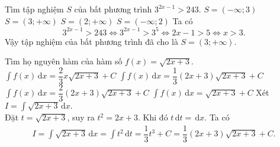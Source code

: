 \begin{ex}%
	Tìm tập nghiệm $S$ của bất phương trình $3^{2x-1}>243$.
	\choice
	{$S=(-\infty;3)$}
	{\True $S=(3;+\infty )$}
	{$S=(2;+\infty )$}
	{$S=(-\infty;2)$}
	\loigiai
	{
		Ta có
		\begin{equation*}
		3^{2x-1}>243 \Leftrightarrow 3^{2x-1} > 3^5 \Leftrightarrow 2x-1 > 5 \Leftrightarrow x > 3.
		\end{equation*}
		Vậy tập nghiệm của bất phương trình đã cho là $S = (3;+\infty)$.
	}
\end{ex}
\begin{ex}%
	Tìm họ nguyên hàm của hàm số $f(x)=\sqrt{2x+3}$.
	\choice
	{$\displaystyle\int f(x)\mathrm{\,d}x=\dfrac{2}{3}x\sqrt{2x+3}+C$}
	{\True $\displaystyle\int f(x)\mathrm{\,d}x=\dfrac{1}{3}(2x+3)\sqrt{2x+3}+C$}
	{$\displaystyle\int f(x)\mathrm{\,d}x=\dfrac{2}{3}(2x+3)\sqrt{2x+3}+C$}
	{$\displaystyle\int f(x)\mathrm{\,d}x=\sqrt{2x+3}+C$}
	\loigiai
	{Xét $ I =\displaystyle \int \limits \sqrt{2x+3} \mathrm{\,d}x. $\\
		Đặt $t = \sqrt{2x+3}$, suy ra $t^2 = 2x+3$. Khi đó $t\mathrm{\,d}t = \mathrm{\,d}x$.
		Ta có
		\begin{align*}
		I = \displaystyle\int \sqrt{2x+3} \mathrm{\,d}x = \displaystyle\int t^2 \mathrm{\,d}t = \dfrac{1}{3}t^3 + C = \dfrac{1}{3}(2x+3)\sqrt{2x+3}+C.
		\end{align*}
	}
\end{ex}
